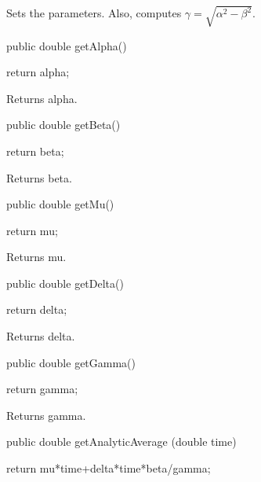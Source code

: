 \begin{tabb} Sets the parameters. Also, computes 
$\gamma = \sqrt{\alpha^2-\beta^2}$.
\end{tabb}
\begin{code}

   public double getAlpha() \begin{hide} {
      return alpha;
   }\end{hide}
\end{code}
\begin{tabb} Returns alpha.
\end{tabb}
\begin{code}

   public double getBeta() \begin{hide} {
      return beta;
   }\end{hide}
\end{code}
\begin{tabb} Returns beta.
\end{tabb}
\begin{code}

   public double getMu() \begin{hide} {
      return mu;
   }\end{hide}
\end{code}
\begin{tabb} Returns mu.
\end{tabb}
\begin{code}

   public double getDelta() \begin{hide} {
      return delta;
   }\end{hide}
\end{code}
\begin{tabb} Returns delta.
\end{tabb}
\begin{code}

   public double getGamma() \begin{hide} {
      return gamma;
   }\end{hide}
\end{code}
\begin{tabb} Returns gamma.
\end{tabb}
\begin{code}

   public double getAnalyticAverage (double time) \begin{hide} {
        return mu*time+delta*time*beta/gamma;
    }\end{hide}
\end{code}
